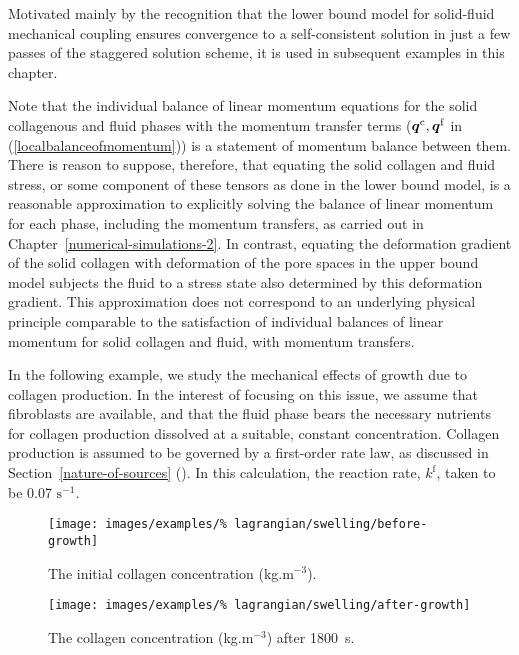 Motivated mainly by the recognition that the lower bound model for
solid-fluid mechanical coupling ensures convergence to a
self-consistent solution in just a few passes of the staggered
solution scheme, it is used in subsequent examples in this chapter.

Note that the individual balance of linear momentum equations for the
solid collagenous and fluid phases with the momentum transfer terms
($\mbox{\boldmath$ q$}^\mathrm{c}, \mbox{\boldmath$ q$}^\mathrm{f}$ in (\ref{localbalanceofmomentum}))
is a statement of momentum balance between them. There is reason to
suppose, therefore, that equating the solid collagen and fluid stress,
or some component of these tensors as done in the lower bound model,
is a reasonable approximation to explicitly solving the balance of
linear momentum for each phase, including the momentum transfers, as
carried out in Chapter~\ref{numerical-simulations-2}. In contrast,
equating the deformation gradient of the solid collagen with
deformation of the pore spaces in the upper bound model subjects the
fluid to a stress state also determined by this deformation
gradient. This approximation does not correspond to an underlying
physical principle comparable to the satisfaction of individual
balances of linear momentum for solid collagen and fluid, with
momentum transfers.

In the following example, we study the mechanical effects of growth
due to collagen production. In the interest of focusing on this issue,
we assume that fibroblasts are available, and that the fluid phase
bears the necessary nutrients for collagen production dissolved at a
suitable, constant concentration. Collagen production is assumed to be
governed by a first-order rate law, as discussed in
Section~\ref{nature-of-sources} (). In this
calculation, the reaction rate, $k^\mathrm{f}$, taken to be 0.07
$\mathrm{s}^{-1}$.

\begin{figure}[!hpt]
  \centering
  \texttt{[image: images/examples/\%
    lagrangian/swelling/before-growth]}
  \caption{The initial collagen concentration (kg.m$^{-3}$).}
  \label{before_growth}
\end{figure}

\begin{figure}[!hpt]
  \centering
  \texttt{[image: images/examples/\%
    lagrangian/swelling/after-growth]}
  \caption{The collagen concentration (kg.m$^{-3}$) after 1800~s.}
  \label{after_growth}
\end{figure}

